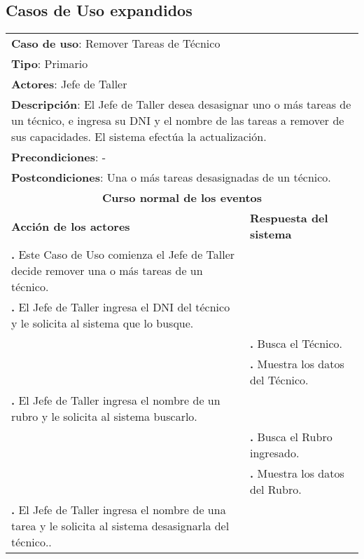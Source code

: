 \documentclass[12pt]{extarticle}
\begin{document}
    \subsection{Casos de Uso expandidos}

    \newcommand\inc{\stepcounter{step}\textbf{\thestep. }}
    \newcommand\resetinc{\setcounter{step}{0}}

    \newcommand\raya{\noindent\rule{169mm}{0.8mm}\\}

	\begin{longtable}{ |p{8cm}|p{8cm}| }
		\hline
		\multicolumn{2}{|p{16cm}|}{\textbf{Caso de uso}: Remover Tareas de Técnico}\\
		\multicolumn{2}{|p{16cm}|}{\textbf{Tipo}: Primario}\\
		\multicolumn{2}{|p{16cm}|}{\textbf{Actores}: Jefe de Taller}\\
		\multicolumn{2}{|p{16cm}|}{\textbf{Descripción}: El Jefe de Taller desea desasignar uno o más tareas de un técnico, e ingresa su DNI y el nombre de las tareas a remover de sus capacidades. El sistema efectúa la actualización.}\\
		\multicolumn{2}{|p{16cm}|}{\textbf{Precondiciones}: - }\\
		\multicolumn{2}{|p{16cm}|}{\textbf{Postcondiciones}: Una o más tareas desasignadas de un técnico.}\\
		\hline
		\multicolumn{2}{|c|}{\textbf{Curso normal de los eventos}}\\
		\hline
		\textbf{Acción de los actores} & \textbf{Respuesta del sistema}\\
		\hline
      \inc Este Caso de Uso comienza el Jefe de Taller decide remover una o más tareas de un técnico.& \\
			\hline
			\inc El Jefe de Taller ingresa el DNI del técnico y le solicita al sistema que lo busque.& \\
			\hline
			& \inc Busca el Técnico.\\
			\hline
			& \inc Muestra los datos del Técnico.\\
			\hline
			\inc El Jefe de Taller ingresa el nombre de un rubro y le solicita al sistema buscarlo.& \\
			\hline
			& \inc Busca el Rubro ingresado. \\
			\hline
			& \inc Muestra los datos del Rubro. \\
			\hline
			\inc El Jefe de Taller ingresa el nombre de una tarea y le solicita al sistema desasignarla del técnico..& \\

\end{longtable}
\end{document}
